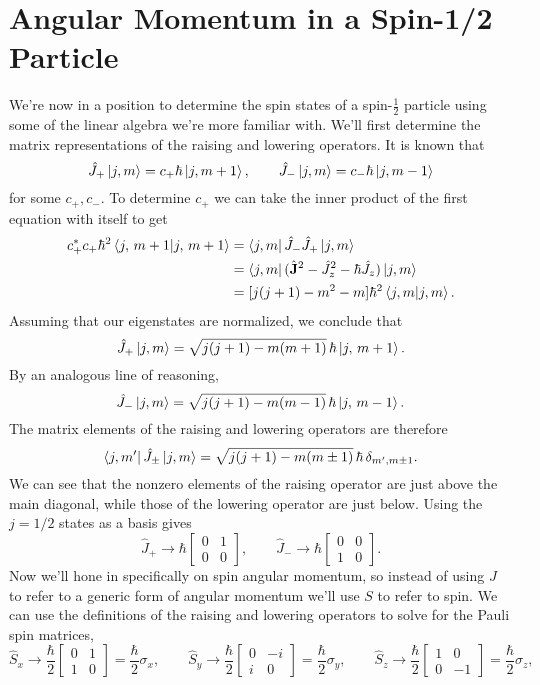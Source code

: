 \documentclass[../p116main.tex]{subfiles}
\begin{document}
\section{Angular Momentum in a Spin-1/2 Particle}
We're now in a position to determine the spin states of a spin-$\frac{1}{2}$ particle using some of the linear algebra we're more familiar with.
We'll first determine the matrix representations of the raising and lowering operators.
It is known that
\[ \hat J_+ \left| j,m \right> = c_+ \hbar \left| j,m+1 \right>, \qquad \hat J_- \left| j,m \right> = c_- \hbar \left| j,m-1 \right> \]
for some $c_+, c_-$.
To determine $c_+$ we can take the inner product of the first equation with itself to get
\begin{align*}
    c_+^* c_+ \hbar^2 \left< j,\, m+1 \middle| j,\, m+1 \right> &= \left< j,m \right| \hat J_- \hat J_+ \left| j,m \right> \\
    &= \left< j,m \right| (\hat{\mathbf{J}}^2 - \hat J_z^2 - \hbar \hat J_z) \left| j,m \right> \\
    &= [j(j+1) - m^2 - m] \hbar^2 \left< j,m \middle| j,m \right>.
\end{align*}
Assuming that our eigenstates are normalized, we conclude that
\[ \hat J_+ \left| j,m \right> = \sqrt{j(j+1) - m(m+1)} \,\hbar \left| j,\, m+1 \right>. \]
By an analogous line of reasoning,
\[ \hat J_- \left| j,m \right> = \sqrt{j(j+1) - m(m-1)} \,\hbar \left| j,\, m-1 \right>. \]
The matrix elements of the raising and lowering operators are therefore
\[ \left< j, m' \right| \hat J_\pm \left| j,m \right> = \sqrt{j(j+1) - m(m \pm 1)} \,\hbar \, \delta_{m', m \pm 1}. \]
We can see that the nonzero elements of the raising operator are just above the main diagonal, while those of the lowering operator are just below.
Using the $j = 1 / 2$ states as a basis gives
\[ \hat J_+ \to \hbar \begin{bmatrix} 0 & 1 \\ 0 & 0 \end{bmatrix}, \qquad \hat J_- \to \hbar \begin{bmatrix} 0 & 0 \\ 1 & 0 \end{bmatrix}. \]
Now we'll hone in specifically on spin angular momentum, so instead of using $J$ to refer to a generic form of angular momentum we'll use $S$ to refer to spin.
We can use the definitions of the raising and lowering operators to solve for the Pauli spin matrices,
\[ \hat S_x \to \frac{\hbar}{2} \begin{bmatrix} 0 & 1 \\ 1 & 0 \end{bmatrix} = \frac{\hbar}{2} \sigma_x, \qquad \hat S_y \to \frac{\hbar}{2} \begin{bmatrix} 0 & -i \\ i & 0 \end{bmatrix} = \frac{\hbar}{2} \sigma_y, \qquad \hat S_z \to \frac{\hbar}{2} \begin{bmatrix} 1 & 0 \\ 0 & -1 \end{bmatrix} = \frac{\hbar}{2} \sigma_z, \]
\end{document}
